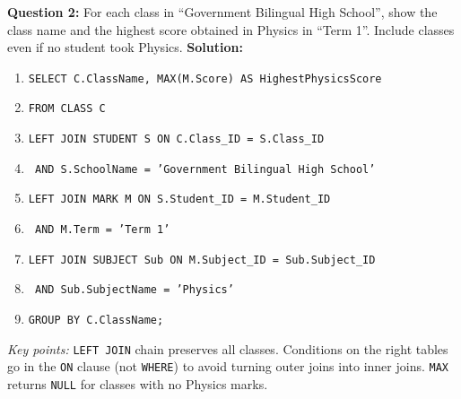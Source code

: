 \documentclass[11pt]{article}
\begin{document}
\begin{exoresolu}
\vspace{0.3cm}
\noindent\textbf{Question 2:} For each class in ``Government Bilingual High School'', show the class name and the highest score obtained in Physics in ``Term 1''. Include classes even if no student took Physics.
\tcblower
\textbf{Solution:}
\begin{enumerate}
\item \texttt{SELECT C.ClassName, MAX(M.Score) AS HighestPhysicsScore}
\item \texttt{FROM CLASS C}
\item \texttt{LEFT JOIN STUDENT S ON C.Class\_ID = S.Class\_ID}
\item \texttt{    AND S.SchoolName = 'Government Bilingual High School'}
\item \texttt{LEFT JOIN MARK M ON S.Student\_ID = M.Student\_ID}
\item \texttt{    AND M.Term = 'Term 1'}
\item \texttt{LEFT JOIN SUBJECT Sub ON M.Subject\_ID = Sub.Subject\_ID}
\item \texttt{    AND Sub.SubjectName = 'Physics'}
\item \texttt{GROUP BY C.ClassName;}
\end{enumerate}
\textit{Key points:} \texttt{LEFT JOIN} chain preserves all classes. Conditions on the right tables go in the \texttt{ON} clause (not \texttt{WHERE}) to avoid turning outer joins into inner joins. \texttt{MAX} returns \texttt{NULL} for classes with no Physics marks.


\end{exoresolu}
\end{document}
